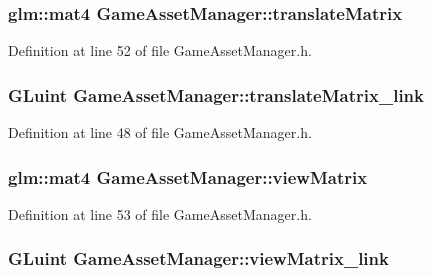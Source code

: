 \subsubsection[{translate\+Matrix}]{\setlength{\rightskip}{0pt plus 5cm}glm\+::mat4 Game\+Asset\+Manager\+::translate\+Matrix\hspace{0.3cm}{\ttfamily [private]}}\label{class_game_asset_manager_a1f0530749ec3ca5ee7925b2b70e8a8c2}


Definition at line 52 of file Game\+Asset\+Manager.\+h.

\hypertarget{class_game_asset_manager_a5e737710573e276ca53c683bc6731a51}{}
\subsubsection[{translate\+Matrix\+\_\+link}]{\setlength{\rightskip}{0pt plus 5cm}G\+Luint Game\+Asset\+Manager\+::translate\+Matrix\+\_\+link\hspace{0.3cm}{\ttfamily [private]}}\label{class_game_asset_manager_a5e737710573e276ca53c683bc6731a51}


Definition at line 48 of file Game\+Asset\+Manager.\+h.

\hypertarget{class_game_asset_manager_a4e702908c5d7d66e40c676d2c4f7930c}{}
\subsubsection[{view\+Matrix}]{\setlength{\rightskip}{0pt plus 5cm}glm\+::mat4 Game\+Asset\+Manager\+::view\+Matrix\hspace{0.3cm}{\ttfamily [private]}}\label{class_game_asset_manager_a4e702908c5d7d66e40c676d2c4f7930c}


Definition at line 53 of file Game\+Asset\+Manager.\+h.

\hypertarget{class_game_asset_manager_a71322a65c085d1d296e87aaddc4aea15}{}
\subsubsection[{view\+Matrix\+\_\+link}]{\setlength{\rightskip}{0pt plus 5cm}G\+Luint Game\+Asset\+Manager\+::view\+Matrix\+\_\+link\hspace{0.3cm}{\ttfamily [private]}}\label{class_game_asset_manager_a71322a65c085d1d296e87aaddc4aea15}


